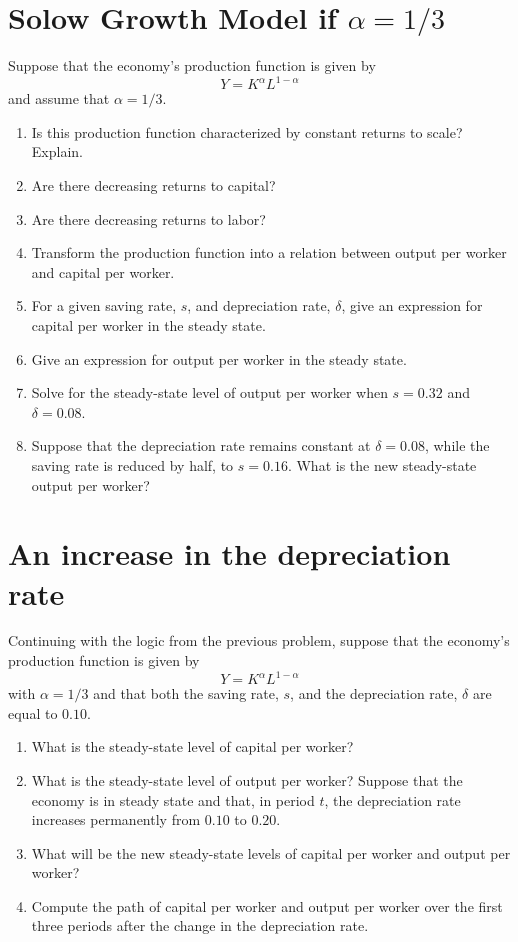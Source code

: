 \documentclass[]{book}
\theoremstyle{definition}
\theoremstyle{definition}
\theoremstyle{definition}
\theoremstyle{remark}
\begin{document}
\section{\texorpdfstring{Solow Growth Model if
\(\alpha = 1/3\)}{Solow Growth Model if \textbackslash{}alpha = 1/3}}\label{solow-growth-model-if-alpha-13}

Suppose that the economy's production function is given by
\[Y=K^{\alpha}L^{1-\alpha}\] and assume that \(\alpha=1/3\).

\begin{enumerate}
\def\labelenumi{\arabic{enumi}.}
\item
  Is this production function characterized by constant returns to
  scale? Explain.
\item
  Are there decreasing returns to capital?
\item
  Are there decreasing returns to labor?
\item
  Transform the production function into a relation between output per
  worker and capital per worker.
\item
  For a given saving rate, \(s\), and depreciation rate, \(\delta\),
  give an expression for capital per worker in the steady state.
\item
  Give an expression for output per worker in the steady state.
\item
  Solve for the steady-state level of output per worker when \(s=0.32\)
  and \(\delta=0.08\).
\item
  Suppose that the depreciation rate remains constant at
  \(\delta=0.08\), while the saving rate is reduced by half, to
  \(s=0.16\). What is the new steady-state output per worker?
\end{enumerate}

\section{An increase in the depreciation
rate}\label{an-increase-in-the-depreciation-rate}

Continuing with the logic from the previous problem, suppose that the
economy's production function is given by \[Y=K^{\alpha}L^{1-\alpha}\]
with \(\alpha=1/3\) and that both the saving rate, \(s\), and the
depreciation rate, \(\delta\) are equal to \(0.10\).

\begin{enumerate}
\def\labelenumi{\arabic{enumi}.}
\item
  What is the steady-state level of capital per worker?
\item
  What is the steady-state level of output per worker? Suppose that the
  economy is in steady state and that, in period \(t\), the depreciation
  rate increases permanently from \(0.10\) to \(0.20\).
\item
  What will be the new steady-state levels of capital per worker and
  output per worker?
\item
  Compute the path of capital per worker and output per worker over the
  first three periods after the change in the depreciation rate.
\end{enumerate}
\end{document}
